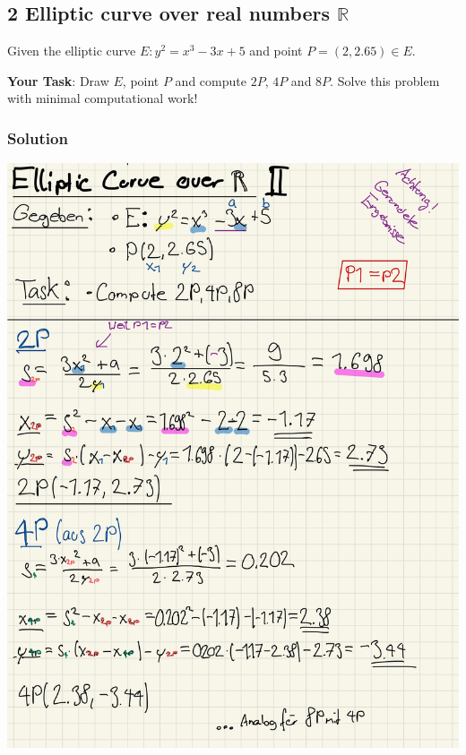 \documentclass[11pt]{article}
\begin{document}
    \hypertarget{elliptic-curve-over-real-numbers-mathbbr}{%
\subsection{\texorpdfstring{2 Elliptic curve over real numbers
\(\mathbb{R}\)}{2 Elliptic curve over real numbers \textbackslash{}mathbb\{R\}}}\label{elliptic-curve-over-real-numbers-mathbbr}}

Given the elliptic curve \(E : y^2 = x^3 - 3x + 5\) and point
\(P = (2,2.65) \in E\).

\textbf{Your Task}: Draw \(E\), point \(P\) and compute \(2P\), \(4P\)
and \(8P\). Solve this problem with minimal computational work!

\hypertarget{solution}{%
\subsubsection{Solution}\label{solution}}

\begin{center}
	\includegraphics[scale=0.87]{img/ecurve2.jpg}
\end{center}
\end{document}
